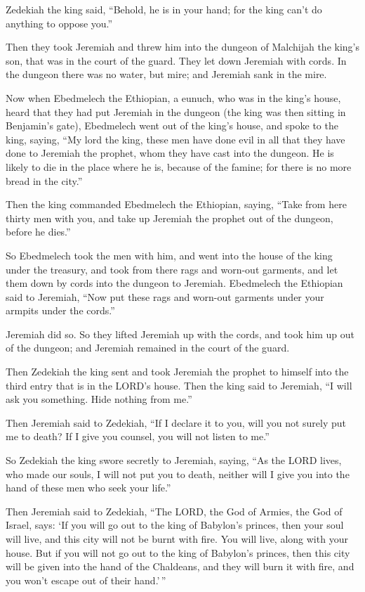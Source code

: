  Zedekiah the king said, ``Behold, he is in your hand; for
the king can't do anything to oppose you.''

 Then they took Jeremiah and threw him into the dungeon of
Malchijah the king's son, that was in the court of the guard. They let
down Jeremiah with cords. In the dungeon there was no water, but mire;
and Jeremiah sank in the mire.

 Now when Ebedmelech the Ethiopian, a eunuch, who was in
the king's house, heard that they had put Jeremiah in the dungeon (the
king was then sitting in Benjamin's gate),  Ebedmelech
went out of the king's house, and spoke to the king, saying,
 ``My lord the king, these men have done evil in all that
they have done to Jeremiah the prophet, whom they have cast into the
dungeon. He is likely to die in the place where he is, because of the
famine; for there is no more bread in the city.''

 Then the king commanded Ebedmelech the Ethiopian,
saying, ``Take from here thirty men with you, and take up Jeremiah the
prophet out of the dungeon, before he dies.''

 So Ebedmelech took the men with him, and went into the
house of the king under the treasury, and took from there rags and
worn-out garments, and let them down by cords into the dungeon to
Jeremiah.  Ebedmelech the Ethiopian said to Jeremiah,
``Now put these rags and worn-out garments under your armpits under the
cords.''

Jeremiah did so.  So they lifted Jeremiah up with the
cords, and took him up out of the dungeon; and Jeremiah remained in the
court of the guard.

 Then Zedekiah the king sent and took Jeremiah the
prophet to himself into the third entry that is in the LORD's house.
Then the king said to Jeremiah, ``I will ask you something. Hide nothing
from me.''

 Then Jeremiah said to Zedekiah, ``If I declare it to
you, will you not surely put me to death? If I give you counsel, you
will not listen to me.''

 So Zedekiah the king swore secretly to Jeremiah, saying,
``As the LORD lives, who made our souls, I will not put you to death,
neither will I give you into the hand of these men who seek your life.''

 Then Jeremiah said to Zedekiah, ``The LORD, the God of
Armies, the God of Israel, says: `If you will go out to the king of
Babylon's princes, then your soul will live, and this city will not be
burnt with fire. You will live, along with your house. 
But if you will not go out to the king of Babylon's princes, then this
city will be given into the hand of the Chaldeans, and they will burn it
with fire, and you won't escape out of their hand.'\,''

